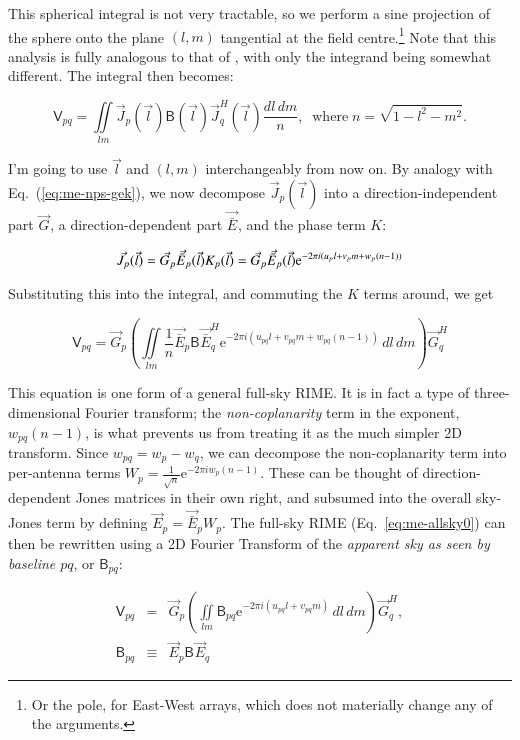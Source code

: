 \documentclass[referee]{aa}
\newcommand{\herm}{H}
\newcommand{\jones}[2]{\vec {#1}_{#2}}
\newcommand{\jonesT}[2]{\vec {#1}^{\herm}_{#2}}
\newcommand{\coh}[2]{\mathsf{{#1}}_{{#2}}}
\begin{document}
This spherical integral is not very tractable, so we perform a sine projection of the sphere onto the plane $(l,m)$ 
tangential at the field centre.\footnote{Or the pole, for East-West arrays, which does not materially change any of the arguments.} Note that this analysis is fully analogous to that of \citet[Sect.~3.1]{tms}, with only the integrand being somewhat different.  The integral then becomes:

\[
\coh{V}{pq} = \iint\limits_{lm} \jones{J}{p}(\vec l) \coh{B}{}(\vec l) \jonesT{J}{q}(\vec l) \frac{dl\,dm}{n},
\;\;\mathrm{where}\; n=\sqrt{1-l^2-m^2}.
\]

I'm going to use $\vec l$ and $(l,m)$ interchangeably from now on. By analogy with Eq.~(\ref{eq:me-nps-gek}), we now decompose $\jones{J}{p}(\vec l)$ into a direction-independent part $\jones{G}{}$, a direction-dependent part $\jones{\bar E}{}$, and the phase term $K$:

\[
\jones{J}{p}(\vec l) = \jones{G}{p}\jones{\bar E}{p}(\vec l) K_p(\vec l) = \jones{G}{p}\jones{\bar E}{p}(\vec l) {\rm e}^{-2\pi i(u_p l+v_p m+w_p (n-1))}
\]

Substituting this into the integral, and commuting the $K$ terms around, we get

\begin{equation}\label{eq:me-allsky0}
\coh{V}{pq} = \jones{G}{p} \left( \iint\limits_{lm} \frac{1}{n} \jones{\bar E}{p} \coh{B}{} \jonesT{\bar E}{q} \mathrm{e} ^{-2\pi i(u_{pq} l+v_{pq} m+w_{pq} (n-1))} \,dl\,dm \right) \jonesT{G}{q}
\end{equation}

This equation is one form of a general full-sky RIME. It is in fact a type of three-dimensional Fourier transform; the \emph{non-coplanarity} term in the exponent, $w_{pq}(n-1)$, is what prevents us from treating it as the much simpler 2D transform. Since $w_{pq}=w_p-w_q$, we can decompose the non-coplanarity term into per-antenna terms $W_p=\frac{1}{\sqrt{n}} \mathrm{e}^{-2\pi i w_p (n-1)}$. These can be thought of direction-dependent Jones matrices in their own right, and subsumed into the overall sky-Jones term by defining $\jones{E}{p} = \jones{\bar E}{p}W_p$. The full-sky RIME (Eq.~\ref{eq:me-allsky0}) can then be rewritten using a 2D Fourier Transform of the \emph{apparent sky as seen by baseline $pq$}, or $\coh{B}{pq}$:

\begin{eqnarray}\label{eq:me-allsky}
\coh{V}{pq} & = & \jones{G}{p} \left( \iint\limits_{lm} \coh{B}{pq} \mathrm{e} ^{-2\pi i(u_{pq} l+v_{pq} m)} \,dl\,dm \right) \jonesT{G}{q}, \\
\nonumber \coh{B}{pq} & \equiv & \jones{E}{p} \coh{B}{} \jones{E}{q}
\end{eqnarray}
\end{document}
